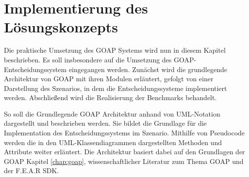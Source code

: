 




\lstset{style=mystyle}


\chapter{Implementierung des Lösungskonzepts}
\label{chap:implementierung lk}

Die praktische Umsetzung des GOAP Systems wird nun in diesem Kapitel beschrieben. Es soll insbesondere auf die Umsetzung des GOAP-Entscheidungssystem eingegangen werden. Zunächst wird die grundlegende Architektur von GOAP mit ihren Modulen erläutert, gefolgt von einer Darstellung des Szenarios, in dem die Entscheidungssysteme implementiert werden. Abschlie\ss{}end wird die Realisierung der Benchmarks behandelt.

So soll die Grundlegende GOAP Architektur anhand von UML-Notation dargestellt und beschrieben werden. Sie bildet die Grundlage für die Implementation des Entscheidungssystems im Szenario. Mithilfe von Pseudocode werden die in den UML-Klassendiagrammen dargestellten Methoden und Attribute weiter erläutert. Die Architektur basiert dabei auf den Grundlagen der GOAP Kapitel \ref{chap:goap}, wissenschaftlicher Literatur zum Thema GOAP und der F.E.A.R SDK\autocite{}.

